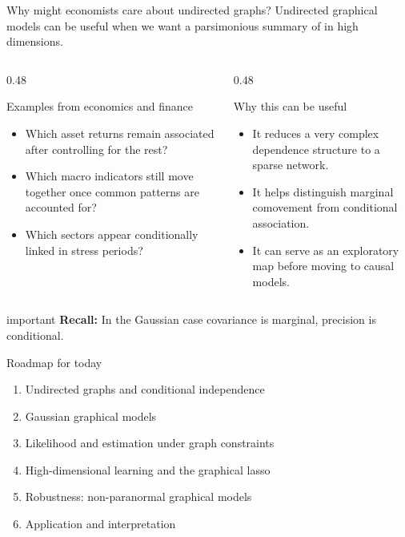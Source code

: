 \documentclass[dvipsnames,aspectratio=169,handout]{beamer}
\begin{document}
\begin{frame}{Why might economists care about undirected graphs?}
Undirected graphical models can be useful when we want a parsimonious summary of  in high dimensions.

\begin{columns}[T]
\begin{column}{0.48\textwidth}
\begin{block}{Examples from economics and finance}
\small 
\begin{itemize}
    \item Which asset returns remain associated after controlling for the rest?
    \item Which macro indicators still move together once common patterns are accounted for?
    \item Which sectors appear conditionally linked in stress periods?
\end{itemize}
\end{block}
\end{column}

\begin{column}{0.48\textwidth}
\begin{block}{Why this can be useful}
\small 
\begin{itemize}
    \item It reduces a very complex dependence structure to a sparse network.
    \item It helps distinguish marginal comovement from conditional association.
    \item It can serve as an exploratory map before moving to causal models.
\end{itemize}
\end{block}
\end{column}
\end{columns}
\begin{beamercolorbox}[wd=\textwidth,sep=7pt,center,rounded=true,shadow=true]{important}
\textbf{Recall:} In the Gaussian  case 
covariance is marginal, precision is conditional.
\end{beamercolorbox}
\end{frame}

\begin{frame}{Roadmap for today}
\begin{enumerate}
    \item Undirected graphs and conditional independence
    \item Gaussian graphical models
    \item Likelihood and estimation under graph constraints
    \item High-dimensional learning and the graphical lasso
    \item Robustness: non-paranormal graphical models
\item Application and interpretation
\end{enumerate}
\end{frame}
\end{document}
